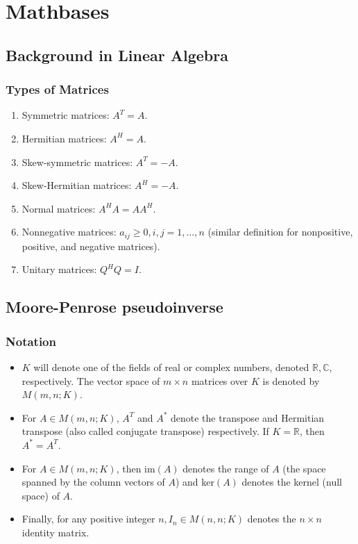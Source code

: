 \chapter{Mathbases}
\label{mathbase}
\section{Background in Linear Algebra}
\subsection{Types of Matrices}
\begin{enumerate}
    \item Symmetric matrices: $A^T = A$.
    \item Hermitian matrices: $A^H = A$.
    \item Skew-symmetric matrices: $A^T = -A$.
    \item Skew-Hermitian matrices: $A^H = -A$.
    \item Normal matrices: $A^H A = A A^H$.
    \item Nonnegative matrices: $a_{ij}\geq 0, i,j=1,\dots,n$ (similar definition for nonpositive, positive, and negative matrices).
    \item Unitary matrices: $Q^H Q = I$.
\end{enumerate}

\section{Moore-Penrose pseudoinverse}
\label{moore-penrose}
\subsection{Notation}
\begin{itemize}
    \item $K$ will denote one of the fields of real or complex numbers, denoted $\mathbb{R},\mathbb{C}$, respectively. The vector space of $m\times n$ matrices over $K$ is denoted by $M(m,n;K)$.
    \item For $A \in M(m,n;K)$, $A^T$ and $A^*$ denote the transpose and Hermitian transpose (also called conjugate transpose) respectively. If $K = \mathbb{R}$, then $A^* = A^T$.
    \item For $A \in M(m,n;K)$, then im$(A)$ denotes the range of $A$ (the space spanned by the column vectors of $A$) and ker$(A)$ \textcolor[rgb]{1,0,0}{denotes the kernel (null space)} of $A$.
    \item Finally, for any positive integer $n, I_n \in M(n,n;K)$ denotes the $n \times n$ identity matrix.
\end{itemize}

